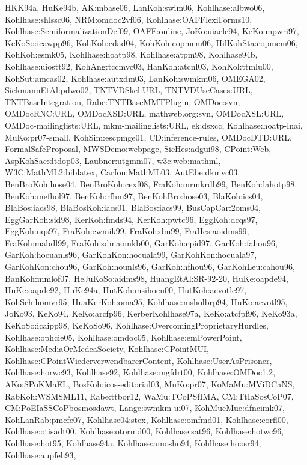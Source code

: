{HKK94a,%
HuKe94b,%
AK:mbase06,%
LanKoh:swim06,%
Kohlhase:albwo06,%
Kohlhase:shlssc06,%
NRM:omdoc2vf06,%
Kohlhase:OAFFlexiForms10,%
Kohlhase:SemiformalizationDef09,%
OAFF:online,%
JoKo:uiaelc94,%
KeKo:mpwri97,%
KeKoSo:icawpp96,%
KohKoh:cdad04,%
KohKoh:copmem06,%
HilKohSta:copmem06,%
KohKoh:esmk05,%
Kohlhase:hoatp98,%
Kohlhase:atpm98,%
Kohlhase94b,%
Kohlhase:uiostt92,%
KohAng:tccmvc03,%
HanKoh:atcnl03,%
KohKol:ttmlu00,%
KohSut:amcas02,%
Kohlhase:autxdm03,%
LanKoh:swmkm06,%
OMEGA02,%
SiekmannEtAl:pdwo02,%
TNTVDSkel:URL,%
TNTVDUseCases:URL,%
TNTBaseIntegration,%
Rabe:TNTBaseMMTPlugin,%
OMDoc:svn,%
OMDocRNC:URL,%
OMDocXSD:URL,%
mathweb.org:svn,%
OMDocXSL:URL,%
OMDoc-mailinglists:URL,%
mkm-mailinglists:URL,%
ek:dsxcc,%
Kohlhase:hoatp-lnai,%
MuKo:pr07-small,%
KohSim:escpmge01,%
CD:inference-rules,%
OMDocDTD:URL,%
FormalSafeProposal,%
MWSDemo:webpage,%
SieHes:adgui98,%
CPoint:Web,%
AspKohSac:dtdop03,%
Laubner:utgmm07,%
w3c:web:mathml,%
W3C:MathML2:biblatex,%
CarIon:MathML03,%
AutEbe:dkmvc03,%
BenBroKoh:hose04,%
BenBroKoh:cexf08,%
FraKoh:mrmkrdb99,%
BenKoh:lahotp98,%
BenKoh:mefhol97,%
BenKoh:rfhm97,%
BenKohBro:hose03,%
BlaKoh:ics04,%
BlaBos:iacs98,%
BlaBosKoh:iacs01,%
BlaBos:iacs99,%
BusCapCar:2oms04,%
EggGarKoh:sid98,%
KerKoh:fmds94,%
KerKoh:pwtc96,%
EggKoh:dcqs97,%
EggKoh:uqs97,%
FraKoh:cwmik99,%
FraKoh:dm99,%
FraHes:aoidms99,%
FraKoh:mabdl99,%
FraKoh:sdmaomkb00,%
GarKoh:cpid97,%
GarKoh:fahou96,%
GarKoh:hocuanls96,%
GarKohKon:hocuala99,%
GarKohKon:hocuala97,%
GarKohKon:chou96,%
GarKoh:hounls96,%
GarKoh:hfhou96,%
GarKohLeu:cahou96,%
BanKoh:mmlof07,%
HeJuKoSo:aidms98,%
HuangEtAl:SR-92-20,%
HuKe:oapde94,%
HuKe:oapde92,%
HuKe94a,%
HutKoh:msihocu00,%
HutKoh:acvotlc97,%
KohSch:homvr95,%
HuaKerKoh:oma95,%
Kohlhase:msholbrp94,%
HuKo:acvotl95,%
JoKo93,%
KeKo94,%
KeKo:arcfp96,%
KerberKohlhase97a,%
KeKo:atcfpf96,%
KeKo93a,%
KeKoSo:icaipp98,%
KeKoSo96,%
Kohlhase:OvercomingProprietaryHurdles,%
Kohlhase:ophcie05,%
Kohlhase:omdoc05,%
Kohlhase:emPowerPoint,%
Kohlhase:MediaOrMedeaSociety,%
Kohlhase:CPointMUI,%
Kohlhase:CPointWiederverwendbarerContent,%
Kohlhase:UserAsPrisoner,%
Kohlhase:horwc93,%
Kohlhase92,%
Kohlhase:mgfdrt00,%
Kohlhase:OMDoc1.2,%
AKo:SPoKMaEL,%
BosKoh:icos-editorial03,%
MuKo:pr07,%
KoMaMu:MViDCaNS,%
RabKoh:WSMSML11,%
Rabe:ttbor12,%
WaMu:TCoPSfIMA,%
CM:TtIaSosCoP07,%
CM:PoEIaSSCoPbosmosdawt,%
Lange:swmkm-ui07,%
KohMueMue:dfncimk07,%
KohLanRab:pmcfe07,%
Kohlhase04:stex,%
Kohlhase:omfmd01,%
Kohlhase:corfl00,%
Kohlhase:otisadt00,%
Kohlhase:otormd00,%
Kohlhase:sat96,%
Kohlhase:hotwc96,%
Kohlhase:hot95,%
Kohlhase94a,%
Kohlhase:amosho94,%
Kohlhase:hoosr94,%
Kohlhase:aupfeh93,%
}
